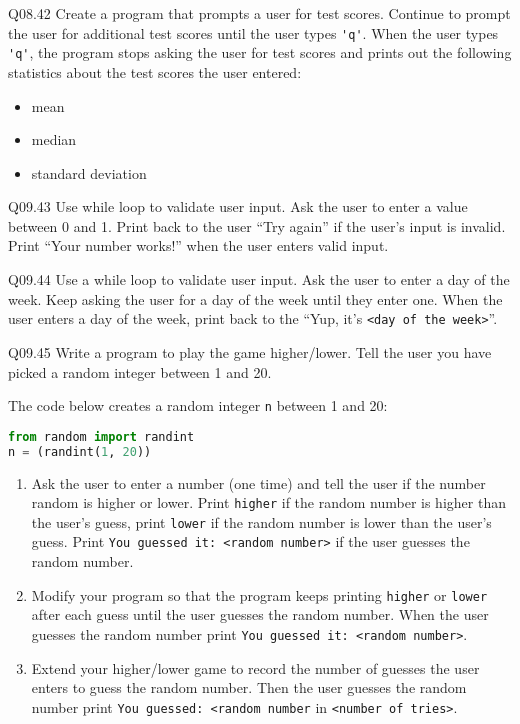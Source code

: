 \documentclass{book}
\providecommand{\tightlist}{%
      \setlength{\itemsep}{0pt}\setlength{\parskip}{0pt}}
\newcommand{\passthrough}[1]{#1}
\begin{document}
Q08.42 Create a program that prompts a user for test scores. Continue to
prompt the user for additional test scores until the user types
\passthrough{\lstinline!'q'!}. When the user types
\passthrough{\lstinline!'q'!}, the program stops asking the user for
test scores and prints out the following statistics about the test
scores the user entered:

\begin{itemize}
\tightlist
\item
  mean
\item
  median
\item
  standard deviation
\end{itemize}

Q09.43 Use while loop to validate user input. Ask the user to enter a
value between 0 and 1. Print back to the user ``Try again'' if the
user's input is invalid. Print ``Your number works!'' when the user
enters valid input.

Q09.44 Use a while loop to validate user input. Ask the user to enter a
day of the week. Keep asking the user for a day of the week until they
enter one. When the user enters a day of the week, print back to the
``Yup, it's \passthrough{\lstinline!<day of the week>!}''.

Q09.45 Write a program to play the game higher/lower. Tell the user you
have picked a random integer between 1 and 20.

The code below creates a random integer \passthrough{\lstinline!n!}
between 1 and 20:

\begin{lstlisting}[language=Python]
from random import randint
n = (randint(1, 20))
\end{lstlisting}

\begin{enumerate}
\def\labelenumi{(\alph{enumi})}
\item
  Ask the user to enter a number (one time) and tell the user if the
  number random is higher or lower. Print
  \passthrough{\lstinline!higher!} if the random number is higher than
  the user's guess, print \passthrough{\lstinline!lower!} if the random
  number is lower than the user's guess. Print
  \passthrough{\lstinline!You guessed it: <random number>!} if the user
  guesses the random number.
\item
  Modify your program so that the program keeps printing
  \passthrough{\lstinline!higher!} or \passthrough{\lstinline!lower!}
  after each guess until the user guesses the random number. When the
  user guesses the random number print
  \passthrough{\lstinline!You guessed it: <random number>!}.
\item
  Extend your higher/lower game to record the number of guesses the user
  enters to guess the random number. Then the user guesses the random
  number print \passthrough{\lstinline!You guessed: <random number!} in
  \passthrough{\lstinline!<number of tries>!}.
\end{enumerate}
\end{document}

